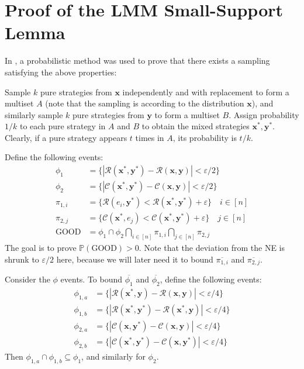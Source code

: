 \section{Proof of the LMM Small-Support Lemma}
\label{app:lmm-proof}

In \cite{lmm03}, a probabilistic method was used to prove that there exists a sampling satisfying the above properties:

Sample $k$ pure strategies from $\mathbf{x}$ independently and with replacement to form a multiset $A$ (note that the sampling is according to the distribution $\mathbf{x}$), and similarly sample $k$ pure strategies from $\mathbf{y}$ to form a multiset $B$. Assign probability $1/k$ to each pure strategy in $A$ and $B$ to obtain the mixed strategies $\mathbf{x}^*, \mathbf{y}^*$. Clearly, if a pure strategy appears $t$ times in $A$, its probability is $t / k$.

Define the following events:
\begin{align*}
  \phi_1      & = \{ |\mathcal{R}(\mathbf{x}^*, \mathbf{y}^*) - \mathcal{R}(\mathbf{x}, \mathbf{y})| < \varepsilon/2 \}        \\
  \phi_2      & = \{ |\mathcal{C}(\mathbf{x}^*, \mathbf{y}^*) - \mathcal{C}(\mathbf{x}, \mathbf{y})| < \varepsilon/2 \}        \\
  \pi_{1, i}  & = \{ \mathcal{R}(e_i, \mathbf{y}^*) < \mathcal{R}(\mathbf{x}^*, \mathbf{y}^*) + \varepsilon \} \quad i \in [n] \\
  \pi_{2, j}  & = \{ \mathcal{C}(\mathbf{x}^*, e_j) < \mathcal{C}(\mathbf{x}^*, \mathbf{y}^*) + \varepsilon \} \quad j \in [n] \\
  \text{GOOD} & = \phi_1 \cap \phi_2 \bigcap_{i \in [n]} \pi_{1, i} \bigcap_{j \in [n]} \pi_{2, j}
\end{align*}
The goal is to prove $\mathbb{P}(\text{GOOD}) > 0$. Note that the deviation from the NE is shrunk to $\varepsilon / 2$ here, because we will later need it to bound $\overline{\pi_{1, i}}$ and $\overline{\pi_{2, j}}$.

Consider the $\phi$ events. To bound $\overline{\phi_1}$ and $\overline{\phi_2}$, define the following events:
\begin{align*}
  \phi_{1, a} & = \{ |\mathcal{R}(\mathbf{x}^*, \mathbf{y}) - \mathcal{R}(\mathbf{x}, \mathbf{y})| < \varepsilon/4 \}     \\
  \phi_{1, b} & = \{ |\mathcal{R}(\mathbf{x}^*, \mathbf{y}^*) - \mathcal{R}(\mathbf{x}^*, \mathbf{y})| < \varepsilon/4 \} \\
  \phi_{2, a} & = \{ |\mathcal{C}(\mathbf{x}, \mathbf{y}^*) - \mathcal{C}(\mathbf{x}, \mathbf{y})| < \varepsilon/4 \}     \\
  \phi_{2, b} & = \{ |\mathcal{C}(\mathbf{x}^*, \mathbf{y}^*) - \mathcal{C}(\mathbf{x}, \mathbf{y}^*)| < \varepsilon/4 \}
\end{align*}
Then $\phi_{1, a} \cap \phi_{1, b} \subseteq \phi_1$, and similarly for $\phi_2$.


